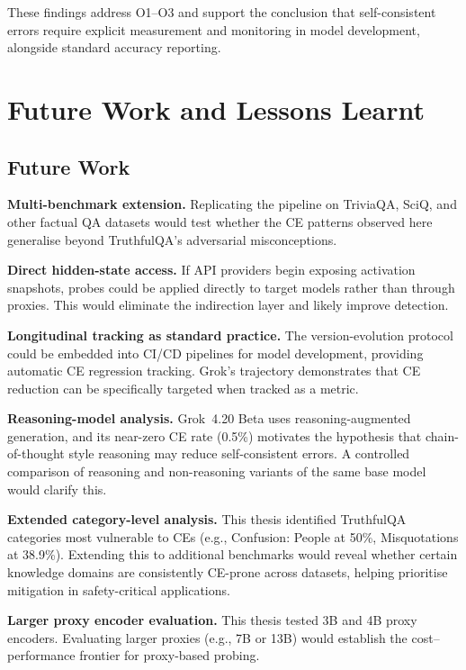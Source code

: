 \documentclass[12pt,twocolumn]{article}
\begin{document}
These findings address O1--O3 and support the conclusion that
self-consistent errors require explicit measurement and monitoring
in model development, alongside standard accuracy reporting.

\section{Future Work and Lessons Learnt}
\label{sec:future}

\subsection{Future Work}

\textbf{Multi-benchmark extension.} Replicating the pipeline on
TriviaQA, SciQ, and other factual QA datasets would test whether
the CE patterns observed here generalise beyond TruthfulQA's
adversarial misconceptions.

\textbf{Direct hidden-state access.} If API providers begin
exposing activation snapshots, probes could be applied directly to
target models rather than through proxies. This would eliminate the
indirection layer and likely improve detection.

\textbf{Longitudinal tracking as standard practice.} The
version-evolution protocol could be embedded into CI/CD pipelines
for model development, providing automatic CE regression tracking.
Grok's trajectory demonstrates that CE reduction can be specifically
targeted when tracked as a metric.

\textbf{Reasoning-model analysis.} Grok~4.20 Beta uses
reasoning-augmented generation, and its near-zero CE rate (0.5\%)
motivates the hypothesis that chain-of-thought style reasoning
\citep{wei2022chain} may
reduce self-consistent errors. A controlled comparison of reasoning
and non-reasoning variants of the same base model would clarify
this.

\textbf{Extended category-level analysis.} This thesis identified
TruthfulQA categories most vulnerable to CEs (e.g., Confusion:
People at 50\%, Misquotations at 38.9\%). Extending this to
additional benchmarks would reveal whether certain knowledge domains
are consistently CE-prone across datasets, helping prioritise
mitigation in safety-critical applications.

\textbf{Larger proxy encoder evaluation.} This thesis tested 3B and
4B proxy encoders. Evaluating larger proxies (e.g., 7B or 13B)
would establish the cost--performance frontier for proxy-based
probing.
\end{document}
